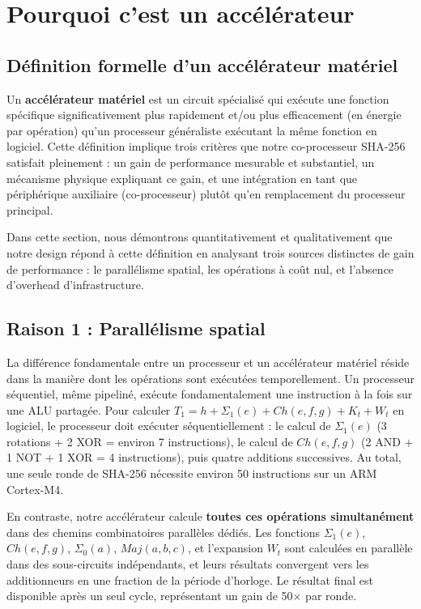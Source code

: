 \section{Pourquoi c'est un accélérateur}
\label{sec:accel}

\subsection{Définition formelle d'un accélérateur matériel}

Un \textbf{accélérateur matériel} est un circuit spécialisé qui exécute une fonction spécifique significativement plus rapidement et/ou plus efficacement (en énergie par opération) qu'un processeur généraliste exécutant la même fonction en logiciel. Cette définition implique trois critères que notre co-processeur SHA-256 satisfait pleinement : un gain de performance mesurable et substantiel, un mécanisme physique expliquant ce gain, et une intégration en tant que périphérique auxiliaire (co-processeur) plutôt qu'en remplacement du processeur principal.

Dans cette section, nous démontrons quantitativement et qualitativement que notre design répond à cette définition en analysant trois sources distinctes de gain de performance : le parallélisme spatial, les opérations à coût nul, et l'absence d'overhead d'infrastructure.

\subsection{Raison 1 : Parallélisme spatial}

La différence fondamentale entre un processeur et un accélérateur matériel réside dans la manière dont les opérations sont exécutées temporellement. Un processeur séquentiel, même pipeliné, exécute fondamentalement une instruction à la fois sur une ALU partagée. Pour calculer $T_1 = h + \Sigma_1(e) + Ch(e,f,g) + K_t + W_t$ en logiciel, le processeur doit exécuter séquentiellement : le calcul de $\Sigma_1(e)$ (3 rotations + 2 XOR = environ 7 instructions), le calcul de $Ch(e,f,g)$ (2 AND + 1 NOT + 1 XOR = 4 instructions), puis quatre additions successives. Au total, une seule ronde de SHA-256 nécessite environ 50 instructions sur un ARM Cortex-M4.

En contraste, notre accélérateur calcule \textbf{toutes ces opérations simultanément} dans des chemins combinatoires parallèles dédiés. Les fonctions $\Sigma_1(e)$, $Ch(e,f,g)$, $\Sigma_0(a)$, $Maj(a,b,c)$, et l'expansion $W_t$ sont calculées en parallèle dans des sous-circuits indépendants, et leurs résultats convergent vers les additionneurs en une fraction de la période d'horloge. Le résultat final est disponible après un seul cycle, représentant un gain de 50$\times$ par ronde.

